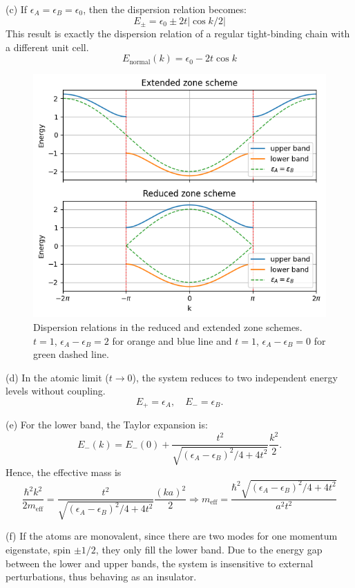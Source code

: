 \documentclass[a4paper,11pt]{article}
\begin{document}
(c) If $\epsilon_A=\epsilon_B=\epsilon_0$, then the dispersion relation becomes:
\begin{equation}
    E_\pm=\epsilon_0\pm2t|\cos k/2|
\end{equation}
This result is exactly the dispersion relation of a regular tight-binding chain with a different unit cell.
\begin{equation}
    E_\text{normal}(k)=\epsilon_0-2t\cos k
\end{equation}

\begin{figure}
    \centering
    \includegraphics[width=0.5\linewidth]{dispersion11-2.png}
    \caption{Dispersion relations in the reduced and extended zone schemes. $t=1$, $\epsilon_A-\epsilon_B=2$ for orange and blue line and $t=1$, $\epsilon_A-\epsilon_B=0$ for green dashed line.} 
    \label{fig:dispersion-11-2}
\end{figure}

(d) In the atomic limit ($t\rightarrow 0$), the system reduces to two independent energy levels without coupling.
\begin{equation}
    E_+=\epsilon_A,\quad E_-=\epsilon_B.
\end{equation}


(e) For the lower band, the Taylor expansion is:
\begin{equation}
    E_-(k)=E_-(0) + \frac{t^2}{\sqrt{(\epsilon_A-\epsilon_B)^2/4 + 4t^2}}\frac{k^2}{2}.
\end{equation}
Hence, the effective mass is 
\begin{equation}
    \frac{\hbar^2k^2}{2m_\text{eff}}=\frac{t^2}{\sqrt{(\epsilon_A-\epsilon_B)^2/4 + 4t^2}}\frac{(ka)^2}{2}\Rightarrow m_\text{eff}=\frac{\hbar^2\sqrt{(\epsilon_A-\epsilon_B)^2/4 + 4t^2}}{a^2t^2}
\end{equation}

(f) If the atoms are monovalent, since there are two modes for one momentum eigenstate, spin $\pm1/2$, they only fill the lower band. Due to the energy gap between the lower and upper bands, the system is insensitive to external perturbations, thus behaving as an insulator.
\end{document}
